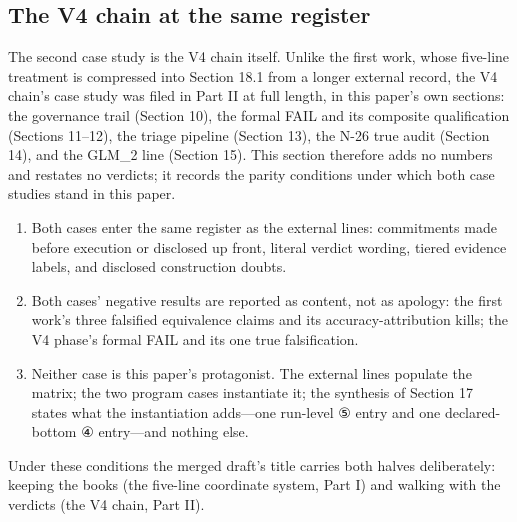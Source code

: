 \documentclass[11pt]{article}
\begin{document}
\subsection{The V4 chain at the same register}
\noindent The second case study is the V4 chain itself. Unlike the first work, whose five-line treatment is compressed into Section 18.1 from a longer external record, the V4 chain's case study was filed in Part II at full length, in this paper's own sections: the governance trail (Section 10), the formal FAIL and its composite qualification (Sections 11–12), the triage pipeline (Section 13), the N-26 true audit (Section 14), and the GLM\_2 line (Section 15). This section therefore adds no numbers and restates no verdicts; it records the parity conditions under which both case studies stand in this paper.\par
\begin{enumerate}[leftmargin=1.9em,itemsep=2pt,parsep=0pt,topsep=3pt]
\item Both cases enter the same register as the external lines: commitments made before execution or disclosed up front, literal verdict wording, tiered evidence labels, and disclosed construction doubts.
\item Both cases' negative results are reported as content, not as apology: the first work's three falsified equivalence claims and its accuracy-attribution kills; the V4 phase's formal FAIL and its one true falsification.
\item Neither case is this paper's protagonist. The external lines populate the matrix; the two program cases instantiate it; the synthesis of Section 17 states what the instantiation adds—one run-level ⑤ entry and one declared-bottom ④ entry—and nothing else.
\end{enumerate}
\noindent Under these conditions the merged draft's title carries both halves deliberately: keeping the books (the five-line coordinate system, Part I) and walking with the verdicts (the V4 chain, Part II).\par
\end{document}
